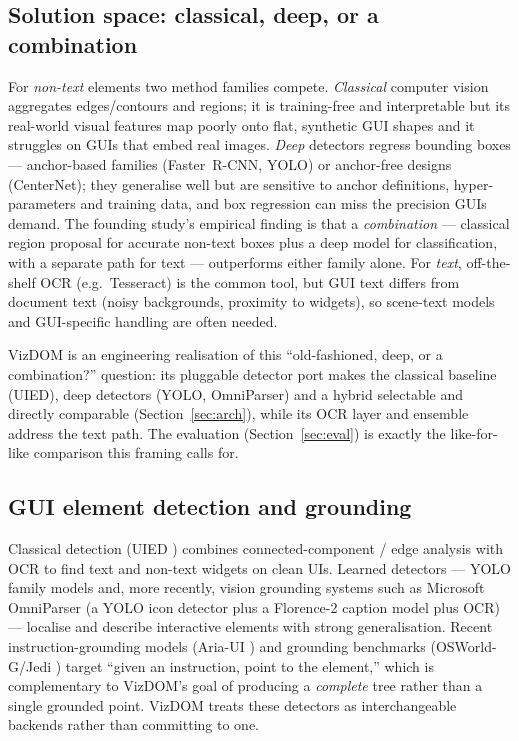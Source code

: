 \documentclass[11pt,a4paper]{article}
\begin{document}
\subsection{Solution space: classical, deep, or a combination}
For \emph{non-text} elements two method families compete. \emph{Classical} computer
vision aggregates edges/contours and regions; it is training-free and interpretable
but its real-world visual features map poorly onto flat, synthetic GUI shapes and it
struggles on GUIs that embed real images. \emph{Deep} detectors regress bounding
boxes --- anchor-based families (Faster~R-CNN, YOLO) or anchor-free designs
(CenterNet); they generalise well but are sensitive to anchor definitions,
hyper-parameters and training data, and box regression can miss the precision GUIs
demand. The founding study's empirical finding \cite{xie2020uied} is that a
\emph{combination} --- classical region proposal for accurate non-text boxes plus a
deep model for classification, with a separate path for text --- outperforms either
family alone. For \emph{text}, off-the-shelf OCR (e.g.\ Tesseract) is the common tool,
but GUI text differs from document text (noisy backgrounds, proximity to widgets), so
scene-text models and GUI-specific handling are often needed.

VizDOM is an engineering realisation of this ``old-fashioned, deep, or a
combination?'' question: its pluggable detector port makes the classical baseline
(UIED), deep detectors (YOLO, OmniParser) and a hybrid selectable and directly
comparable (Section~\ref{sec:arch}), while its OCR layer and ensemble address the text
path. The evaluation (Section~\ref{sec:eval}) is exactly the like-for-like comparison
this framing calls for.

\subsection{GUI element detection and grounding}
Classical detection (UIED \cite{xie2020uied}) combines connected-component / edge
analysis with OCR to find text and non-text widgets on clean UIs. Learned
detectors --- YOLO family models \cite{ultralytics} and, more recently,
vision grounding systems such as Microsoft OmniParser \cite{omniparser2024}
(a YOLO icon detector plus a Florence-2 \cite{florence2} caption model plus OCR)
--- localise and describe interactive elements with strong generalisation. Recent
instruction-grounding models (Aria-UI \cite{ariaui2024}) and grounding benchmarks
(OSWorld-G/Jedi \cite{osworldg}) target ``given an instruction, point to the
element,'' which is complementary to VizDOM's goal of producing a
\emph{complete} tree rather than a single grounded point. VizDOM treats these
detectors as interchangeable backends rather than committing to one.
\end{document}
